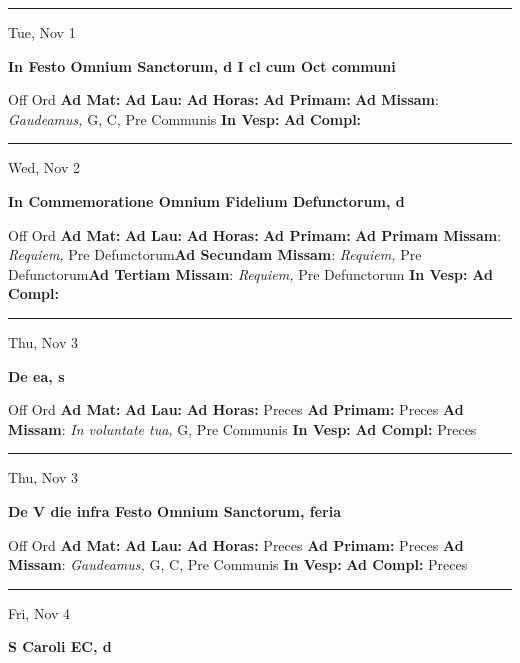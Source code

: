 \documentclass[letterpaper, 10pt]{article}
\begin{document}
\hrule
\begin{center}
Tue, Nov 1
\end{center}\textbf{ \large In Festo Omnium Sanctorum, \textnormal{\normalsize d I cl cum Oct communi}}
\begin{justify}
Off Ord
\textbf{Ad Mat: }
\textbf{Ad Lau: }
\textbf{Ad Horas: }
\textbf{Ad Primam: }
\textbf{Ad Missam}: \textit{Gaudeamus,} G, C, Pre Communis
\textbf{In Vesp: }
\textbf{Ad Compl: }\end{justify}



\hrule
\begin{center}
Wed, Nov 2
\end{center}\textbf{ \large In Commemoratione Omnium Fidelium Defunctorum, \textnormal{\normalsize d}}
\begin{justify}
Off Ord
\textbf{Ad Mat: }
\textbf{Ad Lau: }
\textbf{Ad Horas: }
\textbf{Ad Primam: }
\textbf{Ad Primam Missam}: \textit{Requiem,} Pre Defunctorum\textbf{Ad Secundam Missam}: \textit{Requiem,} Pre Defunctorum\textbf{Ad Tertiam Missam}: \textit{Requiem,} Pre Defunctorum
\textbf{In Vesp: }
\textbf{Ad Compl: }\end{justify}



\hrule
\begin{center}
Thu, Nov 3
\end{center}\textbf{ \large De ea, \textnormal{\normalsize s}}
\begin{justify}
Off Ord
\textbf{Ad Mat: }
\textbf{Ad Lau: }
\textbf{Ad Horas: }Preces
\textbf{Ad Primam: }Preces
\textbf{Ad Missam}: \textit{In voluntate tua,} G, Pre Communis
\textbf{In Vesp: }
\textbf{Ad Compl: }Preces\end{justify}



\hrule
\begin{center}
Thu, Nov 3
\end{center}\textbf{ \large De V die infra Festo Omnium Sanctorum, \textnormal{\normalsize feria}}
\begin{justify}
Off Ord
\textbf{Ad Mat: }
\textbf{Ad Lau: }
\textbf{Ad Horas: }Preces
\textbf{Ad Primam: }Preces
\textbf{Ad Missam}: \textit{Gaudeamus,} G, C, Pre Communis
\textbf{In Vesp: }
\textbf{Ad Compl: }Preces\end{justify}



\hrule
\begin{center}
Fri, Nov 4
\end{center}\textbf{ \large S Caroli EC, \textnormal{\normalsize d}}
\end{document}
